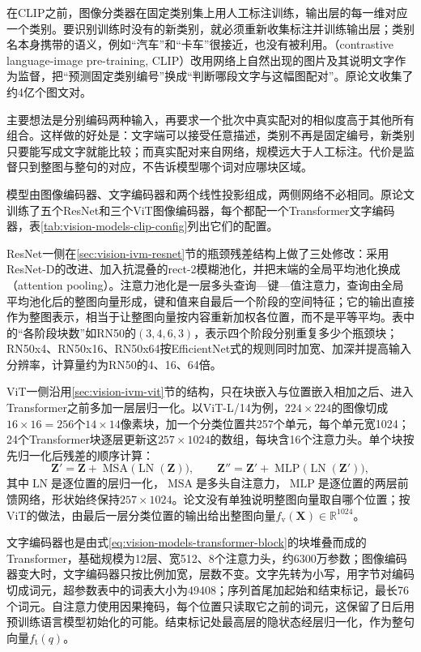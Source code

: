 在CLIP之前，图像分类器在固定类别集上用人工标注训练，输出层的每一维对应一个类别。要识别训练时没有的新类别，就必须重新收集标注并训练输出层；类别名本身携带的语义，例如“汽车”和“卡车”很接近，也没有被利用。（contrastive language-image pre-training, CLIP）改用网络上自然出现的图片及其说明文字作为监督，把“预测固定类别编号”换成“判断哪段文字与这幅图配对”。原论文收集了约4亿个图文对。

主要想法是分别编码两种输入，再要求一个批次中真实配对的相似度高于其他所有组合。这样做的好处是：文字端可以接受任意描述，类别不再是固定编号，新类别只要能写成文字就能比较；而真实配对来自网络，规模远大于人工标注。代价是监督只到整图与整句的对应，不告诉模型哪个词对应哪块区域。

模型由图像编码器、文字编码器和两个线性投影组成，两侧网络不必相同。原论文训练了五个ResNet和三个ViT图像编码器，每个都配一个Transformer文字编码器，表\ref{tab:vision-models-clip-config}列出它们的配置。

ResNet一侧在\ref{sec:vision-ivm-resnet}节的瓶颈残差结构上做了三处修改：采用ResNet-D的改进、加入抗混叠的rect-2模糊池化，并把末端的全局平均池化换成（attention pooling）。注意力池化是一层多头查询—键—值注意力，查询由全局平均池化后的整图向量形成，键和值来自最后一个阶段的空间特征；它的输出直接作为整图表示，相当于让整图向量按内容重新加权各位置，而不是平等平均。表中的“各阶段块数”如RN50的$(3,4,6,3)$，表示四个阶段分别重复多少个瓶颈块；RN50x4、RN50x16、RN50x64按EfficientNet式的规则同时加宽、加深并提高输入分辨率，计算量约为RN50的4、16、64倍。

ViT一侧沿用\ref{sec:vision-ivm-vit}节的结构，只在块嵌入与位置嵌入相加之后、进入Transformer之前多加一层层归一化。以ViT-L/14为例，$224\times224$的图像切成$16\times16=256$个$14\times14$像素块，加一个分类位置共257个单元，每个单元宽1024；24个Transformer块逐层更新这$257\times1024$的数组，每块含16个注意力头。单个块按先归一化后残差的顺序计算：
\begin{equation}
  \bm Z'=\bm Z+\operatorname{MSA}\bigl(\operatorname{LN}(\bm Z)\bigr),
  \qquad
  \bm Z''=\bm Z'+\operatorname{MLP}\bigl(\operatorname{LN}(\bm Z')\bigr),
  \label{eq:vision-models-transformer-block}
\end{equation}
其中$\operatorname{LN}$是逐位置的层归一化，$\operatorname{MSA}$是多头自注意力，$\operatorname{MLP}$是逐位置的两层前馈网络，形状始终保持$257\times1024$。论文没有单独说明整图向量取自哪个位置；按ViT的做法，由最后一层分类位置的输出给出整图向量$f_{\mathrm v}(\bm X)\in\mathbb R^{1024}$。

文字编码器也是由式\eqref{eq:vision-models-transformer-block}的块堆叠而成的Transformer，基础规模为12层、宽512、8个注意力头，约6300万参数；图像编码器变大时，文字编码器只按比例加宽，层数不变。文字先转为小写，用字节对编码切成词元，超参数表中的词表大小为49408；序列首尾加起始和结束标记，最长76个词元。自注意力使用因果掩码，每个位置只读取它之前的词元，这保留了日后用预训练语言模型初始化的可能。结束标记处最高层的隐状态经层归一化，作为整句向量$f_{\mathrm t}(q)$。

